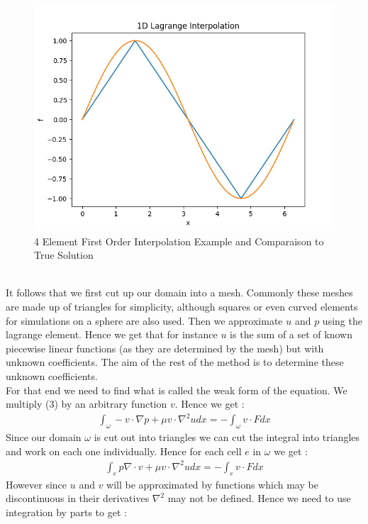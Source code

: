 \documentclass[11pt,twoside,a4paper]{article}
\begin{document}
\begin{figure}
  \includegraphics[width=\linewidth]{ex_1D_LG.png}
  \caption{4 Element First Order Interpolation Example and Comparaison to True Solution}
\end{figure}
\\
It follows that we first cut up our domain into a mesh. Commonly these meshes are made up of triangles for simplicity, although squares or even curved elements for simulations on a sphere are also used. Then we approximate $u$ and $p$ using the lagrange element. Hence we get that for instance $u$ is the sum of a set of known piecewise linear functions (as they are determined by the mesh) but with unknown coefficients. The aim of the rest of the method is to determine these unknown coefficients.\\
For that end we need to find what is called the weak form of the equation. We multiply (3) by an arbitrary function $v$. Hence we get :
\begin{align*}
\int_{\omega} -v \cdot \nabla p + \mu v \cdot \nabla^2 u dx = -\int_{\omega} v \cdot F dx
\end{align*}
Since our domain $\omega$ is cut out into triangles we can cut the integral into triangles and work on each one individually. Hence for each cell $e$ in $\omega$ we get : 
\begin{align*}
\int_{e} p \nabla \cdot v + \mu v \cdot \nabla^2 u dx =  -\int_{e} v \cdot F dx
\end{align*}
However since $u$ and $v$ will be approximated by functions which may be discontinuous in their derivatives $\nabla^2$ may not be defined. Hence we need to use integration by parts to get :  
\end{document}

